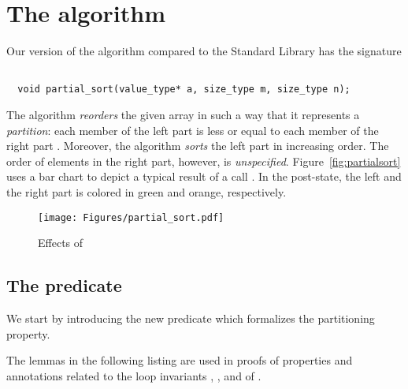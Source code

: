 
\section{The \partialsort algorithm}

Our version of the \partialsort algorithm compared to the \cxx Standard
Library \cite[\S 28.7.1.3]{cxx-17-draft} has the signature

\begin{lstlisting}[style = acsl-block]

  void partial_sort(value_type* a, size_type m, size_type n);
\end{lstlisting}

The algorithm \emph{reorders} the given array  in such a way
that it represents a \emph{partition}:
each member of the
left part  is less or equal to each member of the right
part .
%
Moreover, the algorithm \emph{sorts} the left part in increasing order.
The order of elements in the right part, however, is \emph{unspecified}.
%
Figure~\ref{fig:partialsort} uses a bar chart to
depict a typical result of a call .
%
In the post-state, 
the left and the right part is colored in green and orange,
respectively.


\begin{figure}[hbt]
\begin{center}
\texttt{[image: Figures/partial\_sort.pdf]}
\caption{ Effects of \partialsort}
\end{center}
\end{figure}

\FloatBarrier

\subsection{The predicate \Partition}

We start by introducing the new predicate 
which formalizes the partitioning property.



\clearpage

The lemmas in the following listing are used in proofs of properties and annotations
related to the loop invariants , , and 
of \partialsort.




